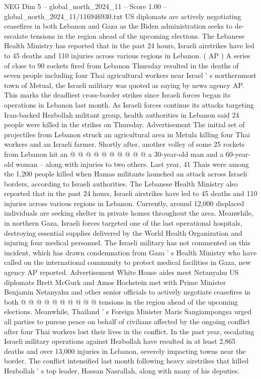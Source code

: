 \begin{textsample}{NEG Dim 5 – global\_north\_2024\_11 – Score 1.00 – global\_north\_2024\_11/116946930.txt}  \label{ex:f5_neg_429}
US diplomats are actively negotiating ceasefires in both Lebanon and Gaza as the Biden administration seeks to de-escalate tensions in the region ahead of the upcoming elections.
The Lebanese Health Ministry has reported that in the past 24 hours, Israeli airstrikes have led to 45 deaths and 110 injuries across various regions in Lebanon. ( AP ) A series of close to 90 rockets fired from Lebanon Thursday resulted in the deaths of seven people including four Thai agricultural workers near Israel ' s northernmost town of Metual, the Israeli military was quoted as saying by news agency AP.
This marks the deadliest cross-border strikes since Israeli forces began its operations in Lebanon last month.
As Israeli forces continue its attacks targeting Iran-backed Hezbollah militant group, health authorities in Lebanon said 24 people were killed in the strikes on Thursday.
Advertisement The initial set of projectiles from Lebanon struck an agricultural area in Metula killing four Thai workers and an Israeli farmer.
Shortly after, another volley of some 25 rockets from Lebanon hit an @ @ @ @ @ @ @ @ @ @ a 30-year-old man and a 60-year-old woman -- along with injuries to two others.
Last year, 41 Thais were among the 1,200 people killed when Hamas militants launched an attack across Israeli borders, according to Israeli authorities.
The Lebanese Health Ministry also reported that in the past 24 hours, Israeli airstrikes have led to 45 deaths and 110 injuries across various regions in Lebanon.
Currently, around 12,000 displaced individuals are seeking shelter in private homes throughout the area.
Meanwhile, in northern Gaza, Israeli forces targeted one of the last operational hospitals, destroying essential supplies delivered by the World Health Organization and injuring four medical personnel.
The Israeli military has not commented on this incident, which has drawn condemnation from Gaza ' s Health Ministry who have called on the international community to protect medical facilities in Gaza, new agency AP reported.
Advertisement White House aides meet Netanyahu US diplomats Brett McGurk and Amos Hochstein met with Prime Minister Benjamin Netanyahu and other senior officials to actively negotiate ceasefires in both @ @ @ @ @ @ @ @ @ @ tensions in the region ahead of the upcoming elections.
Meanwhile, Thailand ' s Foreign Minister Maris Sangiampongsa urged all parties to pursue peace on behalf of civilians affected by the ongoing conflict after four Thai workers lost their lives in the conflict.
In the past year, escalating Israeli military operations against Hezbollah have resulted in at least 2,865 deaths and over 13,000 injuries in Lebanon, severely impacting towns near the border.
The conflict intensified last month following heavy airstrikes that killed Hezbollah ' s top leader, Hassan Nasrallah, along with many of his deputies.

\end{textsample}
